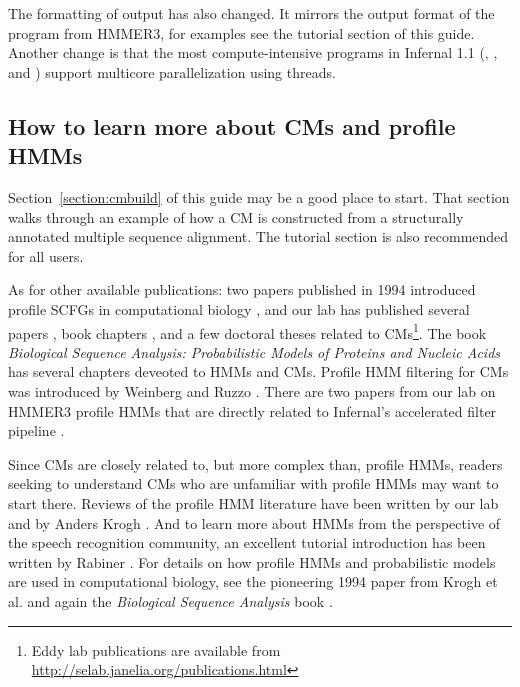 The formatting of  output has also changed. It mirrors
the output format of the  program from HMMER3, for
examples see the tutorial section of this guide. Another change is
that the most compute-intensive programs in Infernal 1.1
(, ,  and
) support multicore parallelization using threads.

\subsection{How to learn more about CMs and profile HMMs}

Section~\ref{section:cmbuild} of this guide may be a good place to
start. That section walks through an example of how a CM is
constructed from a structurally annotated multiple sequence alignment.
The tutorial section is also recommended for all users.

As for other available publications: two papers published in 1994
introduced profile SCFGs in computational biology
\citep{Sakakibara94c,Eddy94}, and our lab has published several papers
\citep{Eddy02b,KleinEddy03,NawrockiEddy07,Nawrocki09,KolbeEddy09,KolbeEddy11},
book chapters \citep{Eddy06b,NawrockiEddy09}, and a few doctoral
theses \citep{Klein03,Nawrocki09b,Kolbe10} related to
CMs\footnote{Eddy lab publications are available from
\url{http://selab.janelia.org/publications.html}}. The book
\emph{Biological Sequence Analysis: Probabilistic Models of Proteins
and Nucleic Acids} \citep{Durbin98} has several chapters deveoted to
HMMs and CMs. Profile HMM filtering for CMs was introduced by Weinberg
and Ruzzo
\citep{WeinbergRuzzo04,WeinbergRuzzo04b,WeinbergRuzzo06}. There are
two papers from our lab on HMMER3 profile HMMs that are directly
related to Infernal's accelerated filter pipeline
\citep{Eddy08,Eddy11}.

Since CMs are closely related to, but more complex than, profile HMMs,
readers seeking to understand CMs who are unfamiliar with profile HMMs
may want to start there.  Reviews of the profile HMM literature have
been written by our lab \citep{Eddy96,Eddy98} and by Anders Krogh
\citep{Krogh98}. And to learn more about HMMs from the perspective of
the speech recognition community, an excellent tutorial introduction
has been written by Rabiner \citep{Rabiner89}. For details on how
profile HMMs and probabilistic models are used in computational
biology, see the pioneering 1994 paper from Krogh et
al. \citep{Krogh94} and again the \emph{Biological Sequence Analysis}
book \citep{Durbin98}.

